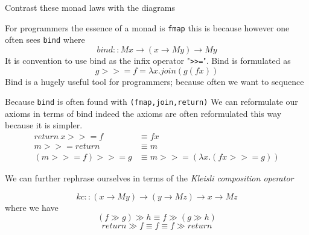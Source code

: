 \documentclass[a4paper,10pt]{article}
\theoremstyle{definition}
\begin{document}
Contrast these monad laws with the diagrams
\begin{center}
    \quad
\end{center}

For programmers the essence of a monad is \texttt{fmap}
this is because
however one often sees \texttt{bind} where
\begin{equation}
    bind :: M x \rightarrow (x \rightarrow M y) \rightarrow M y
\end{equation}
It is convention to use bind as the infix operator "\texttt{>>=}".
Bind is formulated as
\begin{equation}
    g >>= f = \lambda x. join (g (f x))
\end{equation}
Bind is a hugely useful tool for programmers;
because often we want to sequence

Because \texttt{bind} is often found with \texttt{(fmap,join,return)}
We can reformulate our axioms in terms of bind
indeed the axioms are often reformulated this way because it is simpler.
\begin{equation}
  \begin{split}
      return\ x >>= f     &\equiv f x \\
             m >>= return &\equiv m   \\
      (m >>= f) >>= g     &\equiv m >>= (\lambda x.(fx >>= g))
  \end{split}
\end{equation}

We can further rephrase ourselves in terms
of the \textit{Kleisli composition operator}

\begin{equation}
    kc :: (x \rightarrow M y) \rightarrow (y \rightarrow M z) \rightarrow x \rightarrow M z
\end{equation}
where we have
\begin{equation}
    (f \gg g) \gg h \equiv f \gg (g \gg h)
\end{equation}
\begin{equation}
    return \gg f \equiv f \equiv f \gg return
\end{equation}
\end{document}
